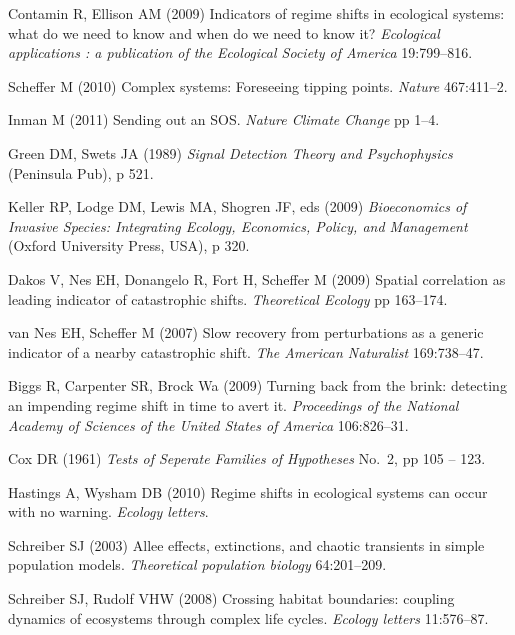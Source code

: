 \documentclass{pnastwo}
\begin{document}
\begin{article}
\begin{thebibliography}{10}
Contamin R, Ellison AM
\newblock (2009) {Indicators of regime shifts in ecological systems: what do we
  need to know and when do we need to know it?}
\newblock \emph{Ecological applications : a publication of the Ecological
  Society of America} 19:799--816.

Scheffer M
\newblock (2010) {Complex systems: Foreseeing tipping points.}
\newblock \emph{Nature} 467:411--2.

Inman M
\newblock (2011) {Sending out an SOS}.
\newblock \emph{Nature Climate Change} pp 1--4.

Green DM, Swets JA
\newblock (1989) \emph{{Signal Detection Theory and Psychophysics}}
\newblock (Peninsula Pub), p 521.

Keller RP, Lodge DM, Lewis MA, Shogren JF, eds
\newblock (2009) \emph{{Bioeconomics of Invasive Species: Integrating Ecology,
  Economics, Policy, and Management}}
\newblock (Oxford University Press, USA), p 320.

Dakos V, Nes EH, Donangelo R, Fort H, Scheffer M
\newblock (2009) {Spatial correlation as leading indicator of catastrophic
  shifts}.
\newblock \emph{Theoretical Ecology} pp 163--174.

van Nes EH, Scheffer M
\newblock (2007) {Slow recovery from perturbations as a generic indicator of a
  nearby catastrophic shift.}
\newblock \emph{The American Naturalist} 169:738--47.

Biggs R, Carpenter SR, Brock Wa
\newblock (2009) {Turning back from the brink: detecting an impending regime
  shift in time to avert it.}
\newblock \emph{Proceedings of the National Academy of Sciences of the United
  States of America} 106:826--31.

Cox DR
\newblock (1961) \emph{{Tests of Seperate Families of Hypotheses}}
\newblock No.{}~2, pp 105 -- 123.

Hastings A, Wysham DB
\newblock (2010) {Regime shifts in ecological systems can occur with no
  warning.}
\newblock \emph{Ecology letters}.

Schreiber SJ
\newblock (2003) {Allee effects, extinctions, and chaotic transients in simple
  population models}.
\newblock \emph{Theoretical population biology} 64:201--209.

Schreiber SJ, Rudolf VHW
\newblock (2008) {Crossing habitat boundaries: coupling dynamics of ecosystems
  through complex life cycles.}
\newblock \emph{Ecology letters} 11:576--87.


\end{thebibliography}
\end{article}
\end{document}
